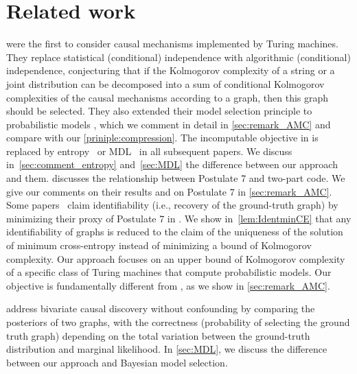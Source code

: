 \section{Related work}
\label{sec:related_work}
%
\citet{janzing2010causal} were the first to consider causal mechanisms implemented by Turing machines. They replace statistical (conditional) independence with algorithmic (conditional) independence, conjecturing that if the Kolmogorov complexity of a string or a joint distribution can be decomposed into a sum of conditional Kolmogorov complexities of the causal mechanisms according to a graph, then this graph should be selected. They also extended their model selection principle to probabilistic models \citep[Postulate 7]{janzing2010causal}, which we comment in detail in \cref{sec:remark_AMC} and compare with our \cref{priniple:compression}.
%
The incomputable objective in \cite[Postulate 7]{janzing2010causal} is replaced by entropy~\citep{SteJanSch10,pranay2021causal} or MDL~\citep{Budhathoki,budhathoki2017mdl,marx2019causal,mian2021discovering,mian2023information} in all subsequent papers. We discuss in~\cref{sec:comment_entropy} and~\cref{sec:MDL} the difference between our approach and them.
\cite{marx2021formally} discusses the relationship between Postulate 7 and two-part code. We give our comments on their results and on Postulate 7 in \cref{sec:remark_AMC}.
Some papers~\citep{marx2019identifiability, marx2019telling, mameche2022discovering, mameche2024learning} claim identifiability (i.e., recovery of the ground-truth graph) by minimizing their proxy of Postulate 7 in \cite{janzing2010causal}. We show in~\cref{lem:IdentminCE} that any identifiability of graphs is reduced to the claim of the uniqueness of the solution of minimum cross-entropy instead of minimizing a bound of Kolmogorov complexity. Our approach focuses on an upper bound of Kolmogorov complexity of a specific class of Turing machines that compute probabilistic models. Our objective is fundamentally different from \cite[Postulate 7]{janzing2010causal}, as we show in \cref{sec:remark_AMC}.

%


%

%
%
\cite{dhirbivariate} address bivariate causal discovery without confounding by comparing the posteriors of two graphs, with the correctness (probability of selecting the ground truth graph) depending on the total variation between the ground-truth distribution and marginal likelihood. In \cref{sec:MDL}, we discuss the difference between our approach and Bayesian model selection.

